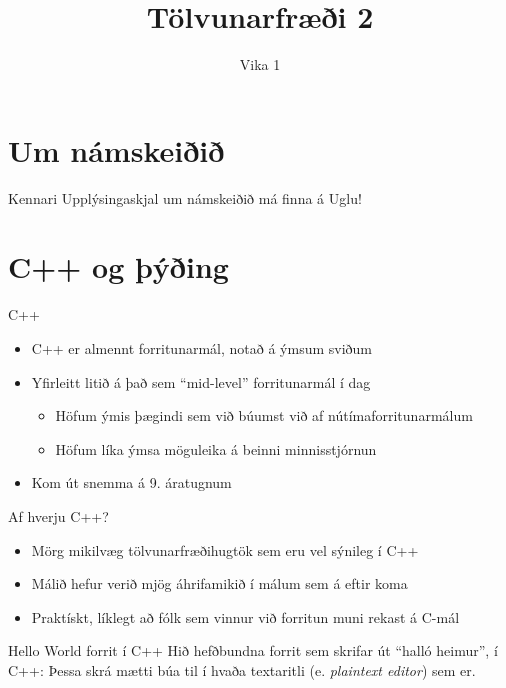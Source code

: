 \documentclass[handout]{beamer}
\title{Tölvunarfræði 2}
\subtitle{Vika 1}
\begin{document}
\begin{frame}
\titlepage
\end{frame}

\section{Um námskeiðið}

\begin{frame}{Kennari}
Upplýsingaskjal um námskeiðið má finna á Uglu!
\end{frame}

\section{C++ og þýðing}

\begin{frame}{C++}
\begin{itemize}
 \item C++ er almennt forritunarmál, notað á ýmsum sviðum
 \item Yfirleitt litið á það sem ``mid-level'' forritunarmál í dag
 \begin{itemize}
  \item Höfum ýmis þægindi sem við búumst við af nútímaforritunarmálum
  \item Höfum líka ýmsa möguleika á beinni minnisstjórnun
 \end{itemize}
 \item Kom út snemma á 9. áratugnum
\end{itemize}
\end{frame}

\begin{frame}{Af hverju C++?}
\begin{itemize}
 \item Mörg mikilvæg tölvunarfræðihugtök sem eru vel sýnileg í C++
 \item Málið hefur verið mjög áhrifamikið í málum sem á eftir koma
 \item Praktískt, líklegt að fólk sem vinnur við forritun muni rekast á C-mál
\end{itemize}
\end{frame}


\begin{frame}[fragile]{Hello World forrit í C++}
Hið hefðbundna forrit sem skrifar út ``halló heimur'', í C++:
Þessa skrá mætti búa til í hvaða textaritli (e. \emph{plaintext editor}) sem er.
\end{frame}
\end{document}
